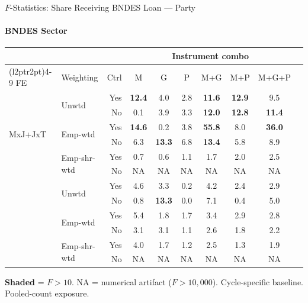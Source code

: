 \documentclass[aspectratio=169,10pt]{beamer}
\newcommand{\fpass}[1]{\cellcolor{pass}\textbf{#1}}
\begin{document}
\begin{frame}[t]{$F$-Statistics: Share Receiving BNDES Loan --- Party}
\framesubtitle{BNDES Sector}
\begin{center}
\footnotesize
\setlength{\tabcolsep}{3.5pt}
\renewcommand{\arraystretch}{1.05}
\begin{tabular}{@{}llrccccccc@{}}
\toprule
 & & & \multicolumn{6}{c}{Instrument combo} \\
\cmidrule(l{2pt}r{2pt}){4-9}
FE & Weighting & Ctrl & M & G & P & M+G & M+P & M+G+P \\
\midrule
  \multirow{6}{*}{MxJ+JxT} & \multirow{2}{*}{Unwtd} & Yes & \fpass{12.4} & 4.0 & 2.8 & \fpass{11.6} & \fpass{12.9} & 9.5 \\
   &  & No & 0.1 & 3.9 & 3.3 & \fpass{12.0} & \fpass{12.8} & \fpass{11.4} \\
   & \multirow{2}{*}{Emp-wtd} & Yes & \fpass{14.6} & 0.2 & 3.8 & \fpass{55.8} & 8.0 & \fpass{36.0} \\
   &  & No & 6.3 & \fpass{13.3} & 6.8 & \fpass{13.4} & 5.8 & 8.9 \\
   & \multirow{2}{*}{Emp-shr-wtd} & Yes & 0.7 & 0.6 & 1.1 & 1.7 & 2.0 & 2.5 \\
   &  & No & NA & NA & NA & NA & NA & NA \\
\addlinespace[5pt]
  \multirow{6}{*}{MxJ+MxT} & \multirow{2}{*}{Unwtd} & Yes & 4.6 & 3.3 & 0.2 & 4.2 & 2.4 & 2.9 \\
   &  & No & 0.8 & \fpass{13.3} & 0.0 & 7.1 & 0.4 & 5.0 \\
   & \multirow{2}{*}{Emp-wtd} & Yes & 5.4 & 1.8 & 1.7 & 3.4 & 2.9 & 2.8 \\
   &  & No & 3.1 & 3.1 & 1.1 & 2.6 & 1.8 & 2.2 \\
   & \multirow{2}{*}{Emp-shr-wtd} & Yes & 4.0 & 1.7 & 1.2 & 2.5 & 1.3 & 1.9 \\
   &  & No & NA & NA & NA & NA & NA & NA \\
\bottomrule
\end{tabular}
\end{center}
{\scriptsize \colorbox{pass}{\textbf{Shaded}} = $F>10$. NA = numerical artifact ($F>10{,}000$). Cycle-specific baseline. Pooled-count exposure.}
\end{frame}
\end{document}
